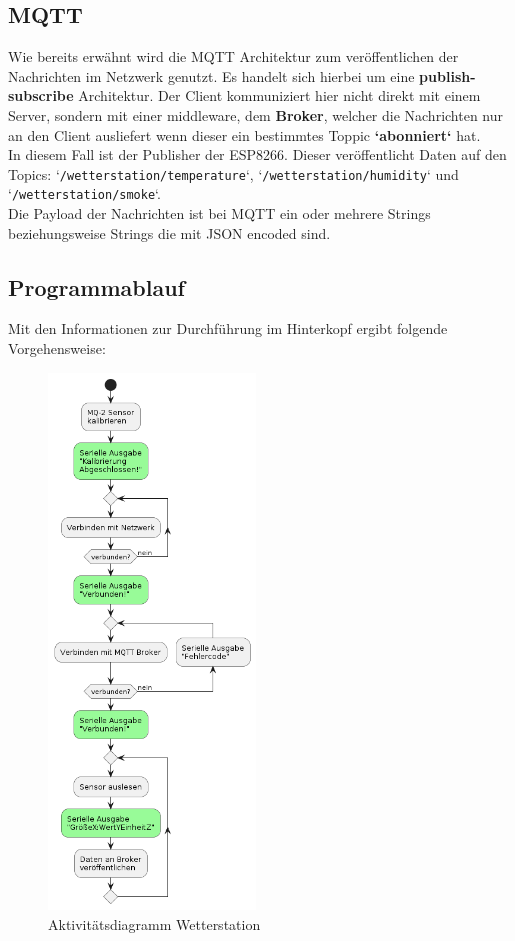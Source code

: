\documentclass[a4paper, 11pt]{article}
\begin{document}
\subsection{MQTT}
Wie bereits erwähnt wird die MQTT Architektur zum veröffentlichen der Nachrichten
im Netzwerk genutzt. Es handelt sich hierbei um eine \textbf{publish-subscribe}
Architektur. Der Client kommuniziert hier nicht direkt mit einem Server, sondern
mit einer middleware, dem \textbf{Broker}, welcher die Nachrichten nur an
den Client ausliefert wenn dieser ein bestimmtes Toppic \textbf{`abonniert`}
hat.\\

In diesem Fall ist der Publisher der ESP8266. Dieser veröffentlicht Daten auf
den Topics: `\texttt{/wetterstation/temperature}`, `\texttt{/wetterstation/humidity}`
und `\texttt{/wetterstation/smoke}`.\\

Die Payload der Nachrichten ist bei MQTT ein oder mehrere Strings beziehungsweise
Strings die mit JSON encoded sind.
\newpage
\subsection{Programmablauf}

Mit den Informationen zur Durchführung im Hinterkopf ergibt folgende
Vorgehensweise:

\begin{figure}[h]
    \begin{center}
        \includegraphics[width=5.5cm]{activity_system.png}
    \caption{Aktivitätsdiagramm Wetterstation}
    \end{center}
\end{figure}
\end{document}
